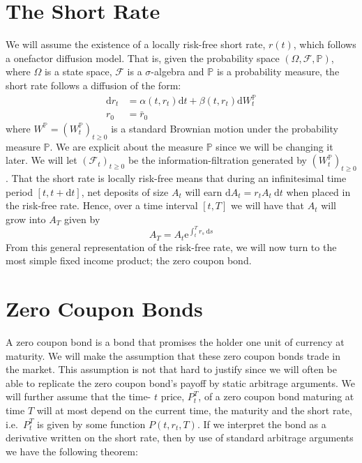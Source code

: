 \documentclass[12pt,twoside]{reedthesis}
\begin{document}
\hypertarget{the-short-rate}{%
\section{The Short Rate}\label{the-short-rate}}

We will assume the existence of a locally risk-free short rate, \(r(t)\), which follows a onefactor diffusion model. That is, given the probability space \((\Omega, \mathcal{F}, \mathbb{P})\), where \(\Omega\) is a state space, \(\mathcal{F}\) is a \(\sigma\)-algebra and \(\mathbb{P}\) is a probability measure, the short rate follows a diffusion of the form:
\[
\begin{aligned}
\mathrm{d} r_{t} &=\alpha\left(t, r_{t}\right) \mathrm{d} t+\beta\left(t, r_{t}\right) \mathrm{d} W_{t}^{\mathbb{P}} \\
r_{0} &=\bar{r}_{0}
\end{aligned}
\]
where \(W^{\mathbb{P}}=\left(W_{t}^{\mathbb{P}}\right)_{t \geq 0}\) is a standard Brownian motion under the probability measure \(\mathbb{P}\). We are explicit about the measure \(\mathbb{P}\) since we will be changing it later. We will let \(\left(\mathcal{F}_{t}\right)_{t \geq 0}\) be the information-filtration generated by \(\left(W_{t}^{\mathbb{P}}\right)_{t \geq 0}\). That the short rate is locally risk-free means that during an infinitesimal time period \([t, t+\mathrm{d} t]\), net deposits of size \(A_{t}\) will earn \(\mathrm{d} A_{t}=r_{t} A_{t} \mathrm{~d} t\) when placed in the risk-free rate. Hence, over a time interval \([t, T]\) we will have that \(A_{t}\) will grow into \(A_{T}\) given by
\[
A_{T}=A_{t} \mathrm{e}^{\int_{t}^{T} r_{s} \mathrm{~d} s}
\]
From this general representation of the risk-free rate, we will now turn to the most simple fixed income product; the zero coupon bond.

\hypertarget{zero-coupon-bonds}{%
\section{Zero Coupon Bonds}\label{zero-coupon-bonds}}

A zero coupon bond is a bond that promises the holder one unit of currency at maturity. We will make the assumption that these zero coupon bonds trade in the market. This assumption is not that hard to justify since we will often be able to replicate the zero coupon bond's payoff by static arbitrage arguments. We will further assume that the time- \(t\) price, \(P_{t}^{T}\), of a zero coupon bond maturing at time \(T\) will at most depend on the current time, the maturity and the short rate, i.e.~\(P_{t}^{T}\) is given by some function \(P\left(t, r_{t}, T\right)\). If we interpret the bond as a derivative written on the short rate, then by use of standard arbitrage arguments we have the following theorem:
\end{document}
